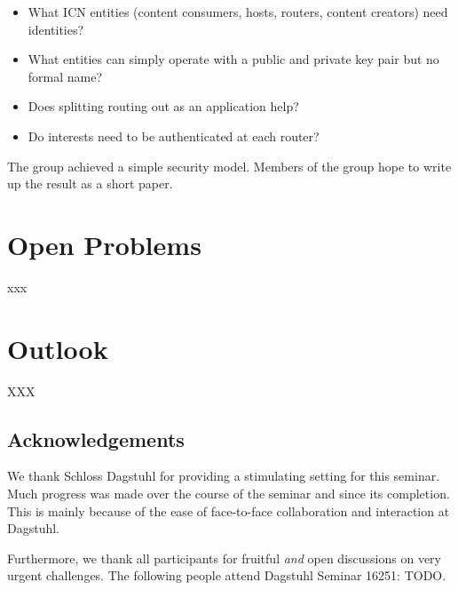 \documentclass{sig-alternate-10pt}
\begin{document}
\begin{itemize}
\item What ICN entities (content consumers, hosts, routers, content creators) need identities?
\item What entities can simply operate with a public and private key pair but no formal name?
\item Does splitting routing out as an application help?
\item Do interests need to be authenticated at each router?
\end{itemize}

The group achieved a simple security model. Members of the group hope to write up the result as a short paper.


\section{Open Problems}
\label{sec:open-problems}

xxx

\section{Outlook}
\label{sec:outlook}
XXX

\subsection{Acknowledgements}
We thank Schloss Dagstuhl for providing a stimulating setting for this seminar. Much
progress was made over the course of the seminar and since its completion. This is mainly
because of the ease of face-to-face collaboration and interaction at Dagstuhl.

Furthermore, we thank all participants for fruitful \emph{and} open discussions on very urgent challenges.
The following people attend Dagstuhl Seminar 16251: TODO.

\small


\end{document}

